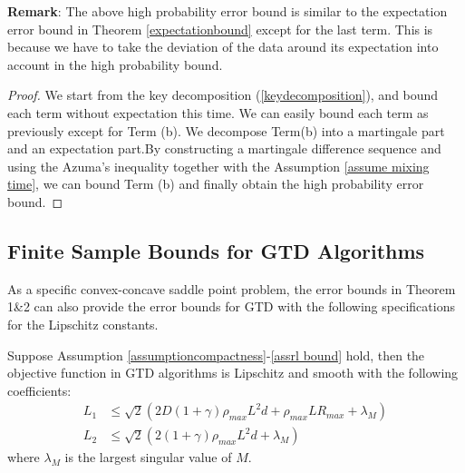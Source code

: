 \documentclass[twoside,11pt]{article}
\numberwithin{equation}{section}
\begin{document}
	\textbf{Remark}: The above high probability error bound is similar to the expectation error bound in Theorem \ref{expectationbound} except for the last term. This is because we have to take the deviation of the data around its expectation into account in the high probability bound.
	
	
	
	\begin{proof}   				
		We start from  the key decomposition (\ref{keydecomposition}), and bound each term without expectation this time. We can easily bound each term as previously except for Term (b). We decompose Term(b) into a martingale part and an expectation part.By  constructing a martingale difference sequence and using the Azuma's inequality together with the Assumption \ref{assume mixing time}, we can bound Term (b) and finally obtain the high probability error bound.
	\end{proof}
	
	
	
	
	\subsection{Finite Sample Bounds for GTD Algorithms}
	As a specific convex-concave saddle point problem, the error bounds in Theorem 1\&2 can also provide the error bounds for GTD with the following specifications for the Lipschitz constants.
	
	\begin{proposition}\label{GTD bound prepare}
		Suppose Assumption \ref{assumptioncompactness}-\ref{assrl bound}  hold, then the objective function in GTD algorithms is Lipschitz and smooth with the following coefficients:		\begin{align*}
		L_1 &\le \sqrt{2}( 2D(1+\gamma)\rho_{max} L^2 d + \rho_{max}LR_{max} +\lambda_M) \\
		L_2 &\le \sqrt{2}(2(1+\gamma)\rho_{max} L^2 d + \lambda_M)
		\end{align*}
		where $\lambda_M$ is the largest singular value of $M$.
	\end{proposition}
	
	
	
	
	
\end{document}
